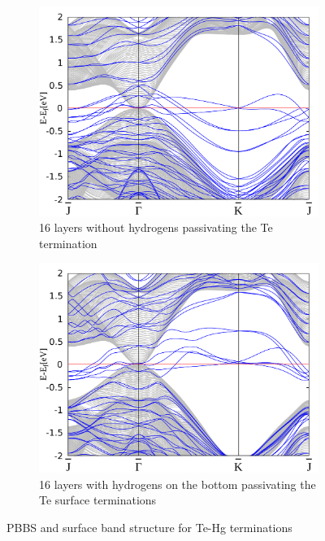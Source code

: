 \begin{figure}[htbp]
\begin{subfigure}[c]{.48\linewidth}
			\includegraphics[width=\linewidth]{Te_and_Hg_termination/no_H_bulk+16_layers_no_dos_-2_2.pdf}
			\caption{16 layers without hydrogens passivating the Te termination} \label{}
		\end{subfigure}
		\hfill
		\begin{subfigure}[c]{.48\linewidth}
			\centering
			\includegraphics[width=\linewidth]{Te_and_Hg_termination/bulk+16_layers_no_dos_-2_2.pdf}
			\caption{16 layers with hydrogens on the bottom passivating the Te surface terminations}
		\end{subfigure}
		\caption{PBBS and surface band structure for Te-Hg terminations} 
		\label{bulk+surface_even_layers}
	\end{figure}

